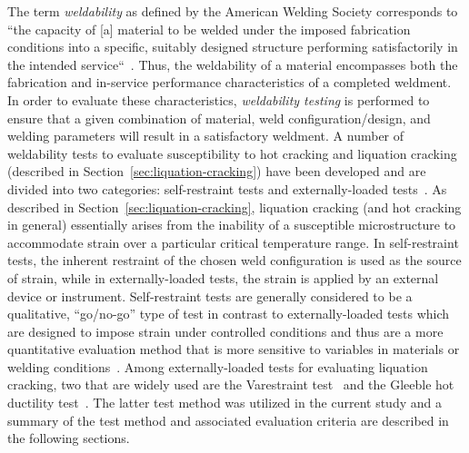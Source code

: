 The term \emph{weldability} as defined by the American Welding Society corresponds to “the capacity of [a] material to be welded under the imposed fabrication conditions into a specific, suitably designed structure performing satisfactorily in the intended service“~\cite{aws_terms_2010}. Thus, the weldability of a material encompasses both the fabrication and in-service performance characteristics of a completed weldment. In order to evaluate these characteristics, \emph{weldability testing} is performed to ensure that a given combination of material, weld configuration/design, and welding parameters will result in a satisfactory weldment. A number of weldability tests to evaluate susceptibility to hot cracking and liquation cracking (described in Section~\ref{sec:liquation-cracking}) have been developed and are divided into two categories: self-restraint tests and externally-loaded tests~\cite{farrar_hot_2005}. As described in Section~\ref{sec:liquation-cracking}, liquation cracking (and hot cracking in general) essentially arises from the inability of a susceptible microstructure to accommodate strain over a particular critical temperature range. In self-restraint tests, the inherent restraint of the chosen weld configuration is used as the source of strain, while in externally-loaded tests, the strain is applied by an external device or instrument. Self-restraint tests are generally considered to be a qualitative, “go/no-go” type of test in contrast to externally-loaded tests which are designed to impose strain under controlled conditions and thus are a more quantitative evaluation method that is more sensitive to variables in materials or welding conditions~\cite{farrar_hot_2005}. Among externally-loaded tests for evaluating liquation cracking, two that are widely used are the Varestraint test~\cite{lundin_varestraint_1965} and the Gleeble\textregistered{} hot ductility test~\cite{nippes_investigation_1955}. The latter test method was utilized in the current study and a summary of the test method and associated evaluation criteria are described in the following sections.




